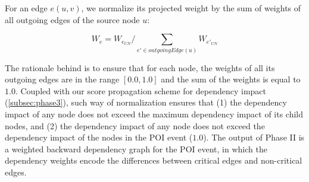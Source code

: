 For an edge $e(u, v)$, we normalize its projected weight by the sum of weights of all outgoing edges of the source node $u$:

\begin{equation}
    \label{eq:local-weight-normalization}
    W_e = W_{e_{UN}}/\sum_{e' \in outgoingEdge(u)} W_{e'_{UN}}
\end{equation}

The rationale behind is to ensure that for each node, the weights of all its outgoing edges are in the range $[0.0, 1.0]$ and the sum of the weights is equal to $1.0$.
%
Coupled with our score propagation scheme for dependency impact (\cref{subsec:phase3}), such way of normalization ensures that (1) the dependency impact of any node does not exceed the maximum dependency impact of its child nodes, and (2) the dependency impact of any node does not exceed the dependency impact of the nodes in the POI event (\ie $1.0$).
%
The output of Phase II is a weighted backward dependency graph for the POI event, in which the dependency weights encode the differences between critical edges and non-critical edges.





